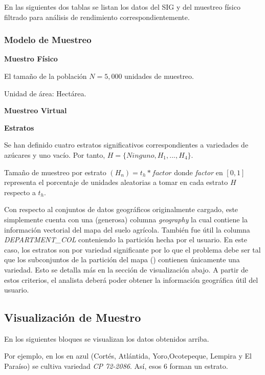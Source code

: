 \documentclass{article}
\begin{document}
En las siguientes dos tablas se listan los datos del SIG y del muestreo físico filtrado para análisis de rendimiento correspondientemente.

\subsubsection{Modelo de Muestreo}

\textbf{Muestro Físico}

\bigbreak

El tamaño de la población $N = 5,000$ unidades de muestreo.

\bigbreak

Unidad de área: Hectárea.

\bigbreak

\textbf{Muestreo Virtual}

\bigbreak

\textbf{Estratos}

\bigbreak

Se han definido cuatro estratos significativos correspondientes a variedades de azúcares y uno vacío. Por tanto, $H = \{ Ninguno, H_1, ... , H_4 \}$.

\bigbreak

Tamaño de muestreo por estrato $(H_n) = t_h * factor$ donde \textit{factor} en $[0,1]$ representa el porcentaje de unidades aleatorias a tomar en cada estrato $H$ respecto a $t_h$.

\bigbreak

Con respecto al conjuntos de datos geográficos originalmente cargado, este simplemente cuenta con una (generosa) columna \textit{geography} la cual contiene la información vectorial del mapa del suelo agrícola. También fue útil la columna \textit{DEPARTMENT\_COL} conteniendo la partición hecha por el usuario. En este caso, los estratos son por variedad significante por lo que el problema debe ser tal que los subconjuntos de la partición del mapa () contienen únicamente una variedad. Esto se detalla más en la sección de visualización abajo. A partir de estos criterios, el analista deberá poder obtener la información geográfica útil del usuario.

\subsection{Visualización de Muestro}

En los siguientes bloques se visualizan los datos obtenidos arriba.

\bigbreak

Por ejemplo, en los  en azul (Cortés, Atlántida, Yoro,Ocotepeque, Lempira y El Paraíso) se cultiva variedad \textit{CP 72-2086}. Así, esos $6$  forman un estrato.


\printbibliography
\end{document}
